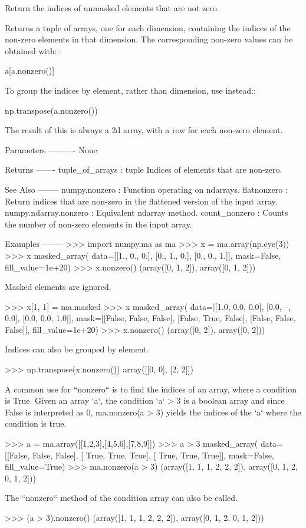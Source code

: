 \begin{DoxyVerb}Return the indices of unmasked elements that are not zero.

Returns a tuple of arrays, one for each dimension, containing the
indices of the non-zero elements in that dimension. The corresponding
non-zero values can be obtained with::

    a[a.nonzero()]

To group the indices by element, rather than dimension, use
instead::

    np.transpose(a.nonzero())

The result of this is always a 2d array, with a row for each non-zero
element.

Parameters
----------
None

Returns
-------
tuple_of_arrays : tuple
    Indices of elements that are non-zero.

See Also
--------
numpy.nonzero :
    Function operating on ndarrays.
flatnonzero :
    Return indices that are non-zero in the flattened version of the input
    array.
numpy.ndarray.nonzero :
    Equivalent ndarray method.
count_nonzero :
    Counts the number of non-zero elements in the input array.

Examples
--------
>>> import numpy.ma as ma
>>> x = ma.array(np.eye(3))
>>> x
masked_array(
  data=[[1., 0., 0.],
[0., 1., 0.],
[0., 0., 1.]],
  mask=False,
  fill_value=1e+20)
>>> x.nonzero()
(array([0, 1, 2]), array([0, 1, 2]))

Masked elements are ignored.

>>> x[1, 1] = ma.masked
>>> x
masked_array(
  data=[[1.0, 0.0, 0.0],
[0.0, --, 0.0],
[0.0, 0.0, 1.0]],
  mask=[[False, False, False],
[False,  True, False],
[False, False, False]],
  fill_value=1e+20)
>>> x.nonzero()
(array([0, 2]), array([0, 2]))

Indices can also be grouped by element.

>>> np.transpose(x.nonzero())
array([[0, 0],
       [2, 2]])

A common use for ``nonzero`` is to find the indices of an array, where
a condition is True.  Given an array `a`, the condition `a` > 3 is a
boolean array and since False is interpreted as 0, ma.nonzero(a > 3)
yields the indices of the `a` where the condition is true.

>>> a = ma.array([[1,2,3],[4,5,6],[7,8,9]])
>>> a > 3
masked_array(
  data=[[False, False, False],
[ True,  True,  True],
[ True,  True,  True]],
  mask=False,
  fill_value=True)
>>> ma.nonzero(a > 3)
(array([1, 1, 1, 2, 2, 2]), array([0, 1, 2, 0, 1, 2]))

The ``nonzero`` method of the condition array can also be called.

>>> (a > 3).nonzero()
(array([1, 1, 1, 2, 2, 2]), array([0, 1, 2, 0, 1, 2]))\end{DoxyVerb}
 \mbox{\label{classnumpy_1_1ma_1_1core_1_1MaskedArray_a2e72e03a8228f3b660b0b554d102f9f1}} 
